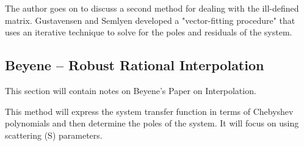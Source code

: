 The author goes on to discuss a second method for dealing with the ill-defined matrix. Gustavensen and Semlyen developed a "vector-fitting procedure" that uses an iterative technique to solve for the poles and residuals of the system.

\subsection{Beyene -- Robust Rational Interpolation}
This section will contain notes on Beyene's Paper on Interpolation.\cite{beyene_uwave}

This method will express the system transfer function in terms of Chebyshev polynomials and then determine the poles of the system. It will focus on using scattering (S) parameters.
